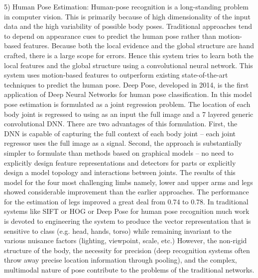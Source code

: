\documentclass[12pt]{article}
\begin{document}
5) Human Pose Estimation: Human-pose recognition is
a long-standing problem in computer vision. This is
primarily because of high dimensionality of the input data
and the high variability of possible body poses. Traditional
approaches  tend to depend on appearance cues to
predict the human pose rather than motion-based features.
Because both the local evidence and the global structure are
hand crafted, there is a large scope for errors. Hence this
system tries to learn both the local features and the global
structure using a convolutional neural network. This system
 uses motion-based features to outperform existing
state-of-the-art techniques to predict the human pose.
Deep Pose, developed in 2014, is the first
application of Deep Neural Networks for human pose
classification. In this model pose estimation is formulated
as a joint regression problem. The location of each body
joint is regressed to using as an input the full image and a 7 layered generic convolutional DNN. There are two
advantages of this formulation. First, the DNN is capable of
capturing the full context of each body joint – each joint
regressor uses the full image as a signal. Second, the
approach is substantially simpler to formulate than methods
based on graphical models – no need to explicitly design
feature representations and detectors for parts or explicitly
design a model topology and interactions between joints.
The results of this model for the four most challenging
limbs namely, lower and upper arms and legs showed
considerable
improvement
than
the
earlier
approaches. The performance for the estimation of
legs improved a great deal from 0.74 to 0.78. In traditional
systems like SIFT or HOG or Deep Pose for
human pose recognition much work is devoted to
engineering the system to produce the vector representation
that is sensitive to class (e.g. head, hands, torso) while
remaining invariant to the various nuisance factors
(lighting, viewpoint, scale, etc.) However, the non-rigid
structure of the body, the necessity for precision (deep
recognition systems often throw away precise location
information through pooling), and the complex, multimodal nature of pose contribute to the problems of the
traditional networks. 
\end{document}
